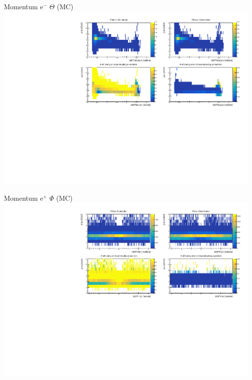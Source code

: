 \documentclass[10pt]{beamer}
\begin{document}
\begin{frame}{Momentum $\textrm{e}^-$ $\Theta$ (MC)}
	\centering
	\includegraphics[width=\textwidth]{Momentum/MThetaem_MC}
\end{frame}

\begin{frame}{Momentum $\textrm{e}^+$ $\Phi$ (MC)}
	\centering
	\includegraphics[width=\textwidth]{Momentum/MPhiep_MC}
\end{frame}
\end{document}
